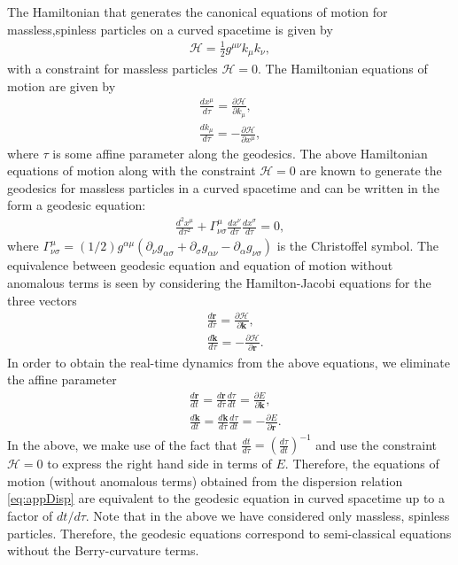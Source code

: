 \documentclass[submission, Phys]{SciPost}
\begin{document}
\begin{appendix}
The Hamiltonian that generates the canonical equations of motion for massless,spinless particles on a curved spacetime is given by \cite{Chandrasekhar}
\begin{align}
    \mathcal{H} = \frac{1}{2}g^{\mu\nu}k_\mu k_\nu,
    \label{eq:line_element_hamiltonian}
\end{align}
with a constraint for massless particles $\mathcal{H}=0$.
The Hamiltonian equations of motion are given by  
\begin{align}
    \frac{d x^\mu}{d \tau}=\frac{\partial \mathcal{H}}{\partial k_\mu}, \\
      \frac{d k_\mu}{d \tau} =-\frac{\partial \mathcal{H}}{\partial x^\mu},
\end{align}
where $\tau$ is some affine parameter along the geodesics.
The above Hamiltonian equations of motion along with the constraint $\mathcal{H}=0$ are known to generate the geodesics for massless particles in a curved spacetime \cite{Chandrasekhar} and can be written in the form a geodesic equation:
\begin{align}
    \frac{d^2 x^\mu}{d\tau^2} + \Gamma^{\mu}_{\nu \sigma} \frac{dx^\nu}{d \tau}\frac{d x^\sigma}{d \tau}=0,
\end{align}
where $\Gamma^{\mu}_{\nu \sigma}=(1/2)g^{\alpha \mu}(\partial_\nu g_{\alpha \sigma}+\partial_\sigma g_{\alpha \nu}-\partial_\alpha g_{\nu \sigma} )$ is the Christoffel symbol.
The equivalence between geodesic equation and equation of motion without anomalous terms is seen by considering the Hamilton-Jacobi equations for the three vectors
\begin{align}
   &\frac{ d\bm{r}}{ d\tau} =\frac{\partial \mathcal{H}}{\partial \bm{k}},\\
  & \frac{ d\bm{k}}{ d\tau}=-\frac{\partial \mathcal{H}}{\partial \bm{r}}.
\end{align}
In order to obtain the real-time dynamics from the above equations, we eliminate the affine parameter
\begin{align}
   &\frac{ d\bm{r}}{ dt} =\frac{ d\bm{r}}{ d\tau}\frac{ d\tau}{ dt}=\frac{\partial E}{\partial \bm{k}},\\
  &\frac{ d\bm{k}}{ dt} =\frac{ d\bm{k}}{ d\tau}\frac{ d\tau}{ dt}=-\frac{\partial E}{\partial \bm{r}}.
\end{align}
In the above, we make use of the fact that $\frac{d t}{d \tau}=\left( \frac{d {\tau}}{d t}\right)^{-1}$ and use the constraint $\mathcal{H}=0$ to express the right hand side in terms of $E$. Therefore, the equations of motion (without anomalous terms) obtained from the dispersion relation \cref{eq:appDisp} are equivalent to the geodesic equation in curved spacetime up to a factor of $dt/d\tau$. Note that in the above we have considered only massless, spinless particles. Therefore, the geodesic equations correspond to semi-classical equations without the Berry-curvature terms. 


\end{appendix}
\end{document}

